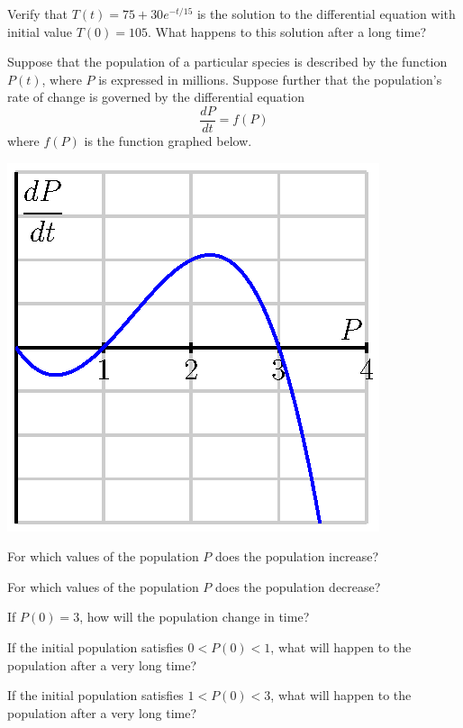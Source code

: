 \begin{exercises}
        \item Verify that $T(t) = 75 + 30e^{-t/15}$ is the
        solution to the differential equation with initial value $T(0)
        = 105$.  What happens to this solution after a long time?
  \ea
  
  \item Suppose that the population of a particular species is
    described by the function $P(t)$, where $P$ is expressed in
    millions.  Suppose further that the population's rate of change is
    governed by the differential equation 
    $$\frac{dP}{dt} = f(P)
    $$
    where $f(P)$ is the function graphed below.

    \begin{center}
      \includegraphics{figures/7_1_threshold.eps}
    \end{center}

\ba
    \item For which values of the population $P$ does the population
      increase?

      \item For which values of the population $P$ does the population
      decrease? 

      \item  If $P(0) = 3$, how will the population change in time?

     \item  If the initial population satisfies $0<P(0)<1$, what will
      happen to the population after a very long time?

      \item  If the initial population satisfies $1<P(0)<3$, what will
      happen to the population after a very long time?


\end{exercises}
